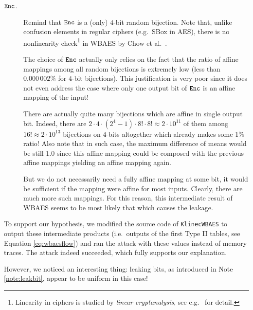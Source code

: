 \begin{description}
	\item[$\texttt{Enc}$.] Remind that $\texttt{Enc}$ is a (only) $4$-bit random bijection. Note that, unlike confusion elements in regular ciphers (e.g.\ SBox in AES), there is no nonlinearity check\footnote{Linearity in ciphers is studied by {\em linear cryptanalysis}, see e.g.\ \cite{matsui1993linear} for detail.} in WBAES by Chow et al.\ \cite{chow2002aes}.
	
	The choice of $\texttt{Enc}$ actually only relies on the fact that the ratio of affine mappings among all random bijections is extremely low (less than $0.000\,002\%$ for $4$-bit bijections). This justification is very poor since it does not even address the case where only one output bit of $\texttt{Enc}$ is an affine mapping of the input!
	
	There are actually quite many bijections which are affine in single output bit. Indeed, there are $2\cdot4\cdot(2^4-1)\cdot8!\cdot8! \approx 2\cdot10^{11}$ of them among $16! \approx 2\cdot10^{13}$ bijections on $4$-bits altogether which already makes some $1\%$ ratio! Also note that in such case, the maximum difference of means would be still $1.0$ since this affine mapping could be composed with the previous affine mappings yielding an affine mapping again.
	
	But we do not necessarily need a fully affine mapping at some bit, it would be sufficient if the mapping were affine for most inputs. Clearly, there are much more such mappings. For this reason, this intermediate result of WBAES seems to be most likely that which causes the leakage.
\end{description}

To support our hypothesis, we modified the source code of {\tt KlinecWBAES} to output these intermediate products (i.e.\ outputs of the first Type II tables, see Equation \ref{eq:wbaesflow}) and ran the attack with these values instead of memory traces. The attack indeed succeeded, which fully supports our explanation.

However, we noticed an interesting thing: leaking bits, as introduced in Note \ref{note:leakbit}, appear to be uniform in this case!

